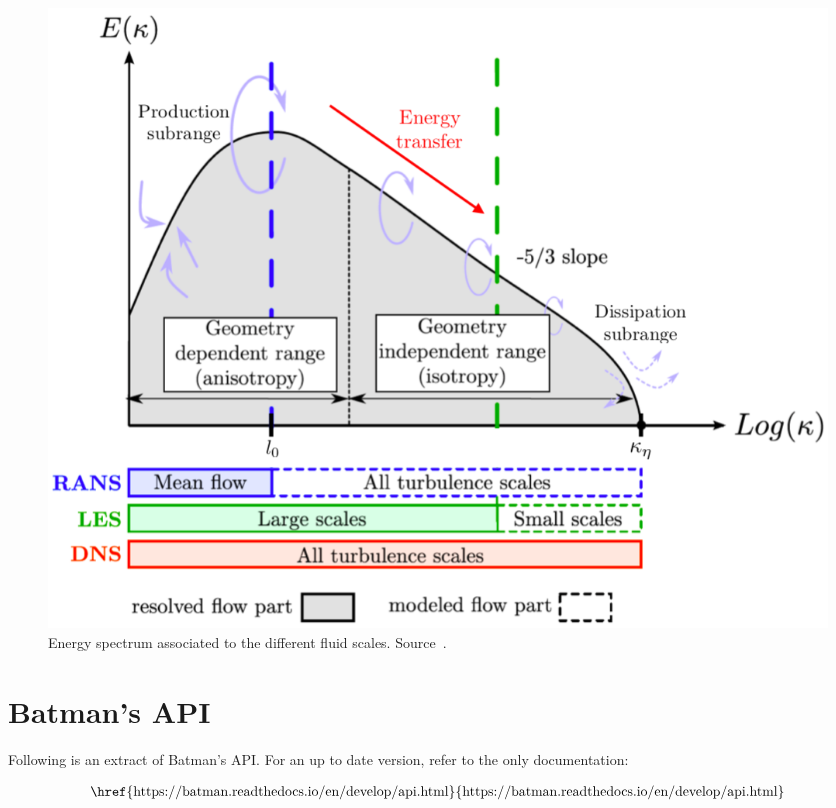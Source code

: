 \begin{figure}[!ht]
\centering
\includegraphics[width=\linewidth,keepaspectratio]{fig/applications/ls89/energy_cascade.png}
\caption{Energy spectrum associated to the different fluid scales. Source~\cite{Fransen2013}.}
\label{fig:energy_cascade}
\end{figure}

\chapter{Batman's API}
\label{sec:api_ref}

Following is an extract of Batman's API. For an up to date version, refer to the only documentation:

\begin{align}
\text{\href{https://batman.readthedocs.io/en/develop/api.html}{https://batman.readthedocs.io/en/develop/api.html}}	\nonumber
\end{align}





